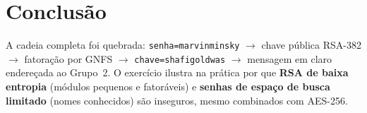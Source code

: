 \documentclass[11pt,a4paper]{article}
\begin{document}
\section*{Conclusão}
A cadeia completa foi quebrada: \texttt{senha=marvinminsky} $\rightarrow$ chave pública RSA-382
$\rightarrow$ fatoração por GNFS $\rightarrow$ \texttt{chave=shafigoldwas} $\rightarrow$ mensagem em
claro endereçada ao Grupo~2. O exercício ilustra na prática por que \textbf{RSA de baixa entropia}
(módulos pequenos e fatoráveis) e \textbf{senhas de espaço de busca limitado} (nomes conhecidos) são
inseguros, mesmo combinados com AES-256.
\end{document}

